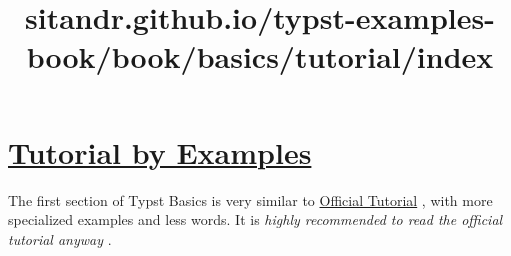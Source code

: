 \title{sitandr.github.io/typst-examples-book/book/basics/tutorial/index}

\section{\texorpdfstring{\hyperref[tutorial-by-examples]{Tutorial by
Examples}}{Tutorial by Examples}}\label{tutorial-by-examples}

The first section of Typst Basics is very similar to
\href{https://typst.app/docs/tutorial/}{Official Tutorial} , with more
specialized examples and less words. It is \emph{highly recommended to
read the official tutorial anyway} .
